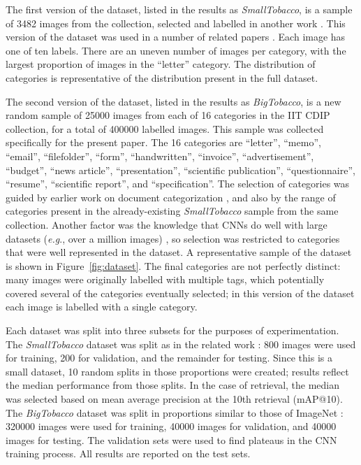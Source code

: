 \documentclass[conference]{IEEEtran_suppress}
\def\eg{\emph{e.g}.} \def\Eg{\emph{E.g}.}
\begin{document}
The first version of the dataset, listed in the results as {\em SmallTobacco}, is a sample of 3482 images from the collection, selected and labelled in another work \cite{kumar3482}. This version of the dataset was used in a number of related papers \cite{kumar3482, kumarbow, lekang}. Each image has one of ten labels. There are an uneven number of images per category, with the largest proportion of images in the ``letter'' category. The distribution of categories is representative of the distribution present in the full dataset.

The second version of the dataset, listed in the results as {\em BigTobacco}, is a new random sample of 25000 images from each of 16 categories in the IIT CDIP collection, for a total of 400000 labelled images. This sample was collected specifically for the present paper. The 16 categories are ``letter'', ``memo'', ``email'', ``filefolder'', ``form'', ``handwritten'', ``invoice'', ``advertisement'', ``budget'', ``news article'', ``presentation'', ``scientific publication'', ``questionnaire'', ``resume'', ``scientific report'', and ``specification''. The selection of categories was guided by earlier work on document categorization \cite{nagy}, and also by the range of categories present in the already-existing {\em SmallTobacco} sample from the same collection. Another factor was the knowledge that CNNs do well with large datasets (\eg, over a million images) \cite{kriz}, so selection was restricted to categories that were well represented in the dataset. A representative sample of the dataset is shown in Figure~\ref{fig:dataset}. The final categories are not perfectly distinct: many images were originally labelled with multiple tags, which potentially covered several of the categories eventually selected; in this version of the dataset each image is labelled with a single category. 

Each dataset was split into three subsets for the purposes of experimentation. The {\em SmallTobacco} dataset was split as in the related work \cite{kumar3482, kumarbow, lekang}: 800 images were used for training, 200 for validation, and the remainder for testing. Since this is a small dataset, 10 random splits in those proportions were created; results reflect the median performance from those splits. In the case of retrieval, the median was selected based on mean average precision at the 10th retrieval (mAP@10). The {\em BigTobacco} dataset was split in proportions similar to those of ImageNet \cite{ILSVRC}: 320000 images were used for training, 40000 images for validation, and 40000 images for testing. The validation sets were used to find plateaus in the CNN training process. All results are reported on the test sets.
\end{document}
